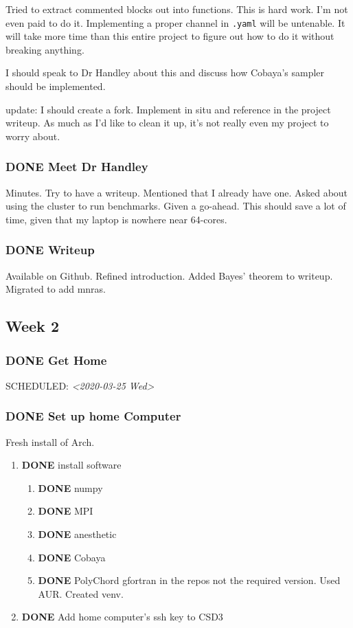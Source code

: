 \documentclass[11pt]{article}
\begin{document}
Tried to extract commented blocks out into functions. This is hard
work. I'm not even paid to do it. Implementing a proper channel in
\texttt{.yaml} will be untenable. It will take more time than this entire
project to figure out how to do it without breaking anything.

I should speak to Dr Handley about this and discuss how Cobaya's
sampler should be implemented.

update: I should create a fork. Implement in situ and reference in
the project writeup. As much as I'd like to clean it up, it's not
really even my project to worry about.

\subsubsection{{\bfseries\sffamily DONE} Meet Dr Handley}
\label{sec:org1a95e3f}
Minutes. Try to have a writeup. Mentioned that I already have
one. Asked about using the cluster to run benchmarks. Given a
go-ahead. This should save a lot of time, given that my laptop is
nowhere near 64-cores. 
\subsubsection{{\bfseries\sffamily DONE} Writeup}
\label{sec:orgff42c1d}
Available on Github. Refined introduction. Added Bayes' theorem to
writeup. Migrated to add mnras.


\subsection{Week 2}
\label{sec:org1bd0a5e}
\subsubsection{{\bfseries\sffamily DONE} Get Home}
\label{sec:orgd6b92c1}
SCHEDULED: \textit{<2020-03-25 Wed>}
\subsubsection{{\bfseries\sffamily DONE} Set up home Computer}
\label{sec:org08560fb}
Fresh install of Arch. 
\begin{enumerate}
\item {\bfseries\sffamily DONE} install software
\label{sec:orgc8d7f49}
\begin{enumerate}
\item {\bfseries\sffamily DONE} numpy
\label{sec:org11e1725}
\item {\bfseries\sffamily DONE} MPI
\label{sec:org22f710d}
\item {\bfseries\sffamily DONE} anesthetic
\label{sec:orgfb0885a}
\item {\bfseries\sffamily DONE} Cobaya
\label{sec:org495f667}
\item {\bfseries\sffamily DONE} PolyChord
\label{sec:orgb07dc17}
gfortran in the repos not the required version. Used AUR. Created venv.
\end{enumerate}
\item {\bfseries\sffamily DONE} Add home computer's ssh key to CSD3
\label{sec:org3977125}
\end{enumerate}
\end{document}
